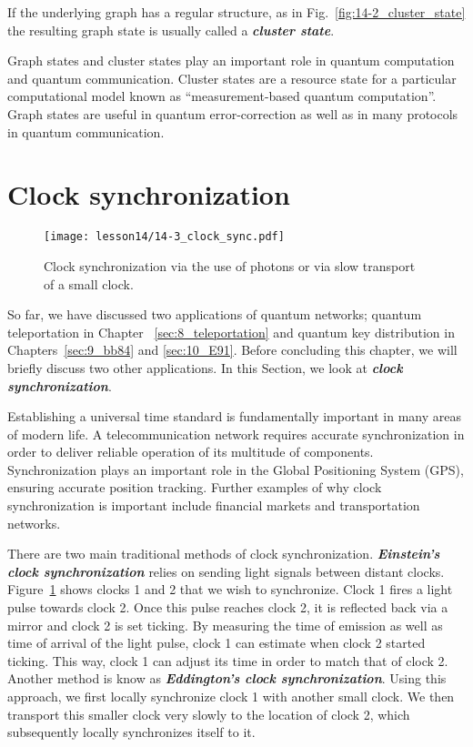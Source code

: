 If the underlying graph has a regular structure, as in Fig.~\ref{fig:14-2_cluster_state} the resulting graph state is usually called a \textbf{\emph{cluster state}}.

Graph states and cluster states play an important role in quantum computation and quantum communication.
Cluster states are a resource state for a particular computational model known as ``measurement-based quantum computation''.
Graph states are useful in quantum error-correction as well as in many protocols in quantum communication.




\section{Clock synchronization}
\label{sec:14-3_clock_sync}

\begin{figure}[t]
    \centering
    \texttt{[image: lesson14/14-3\_clock\_sync.pdf]}
    \caption[Clock synchronization.]{Clock synchronization via the use of photons or via slow transport of a small clock.}
    \label{fig:14-3_clock_sync}
\end{figure}

So far, we have discussed two applications of quantum networks; quantum teleportation in Chapter ~\ref{sec:8_teleportation} and quantum key distribution in Chapters~\ref{sec:9_bb84} and \ref{sec:10_E91}.
Before concluding this chapter, we will briefly discuss two other applications.
In this Section, we look at \textbf{\emph{clock synchronization}}.

Establishing a universal time standard is fundamentally important in many areas of modern life.
A telecommunication network requires accurate synchronization in order to deliver reliable operation of its multitude of components.
Synchronization plays an important role in the Global Positioning System (GPS), ensuring accurate position tracking.
Further examples of why clock synchronization is important include financial markets and transportation networks.

There are two main traditional methods of clock synchronization.
\textbf{\emph{Einstein's clock synchronization}} relies on sending light signals between distant clocks.
Figure~\ref{fig:14-3_clock_sync} shows clocks 1 and 2 that we wish to synchronize.
Clock 1 fires a light pulse towards clock 2.
Once this pulse reaches clock 2, it is reflected back via a mirror and clock 2 is set ticking.
By measuring the time of emission as well as time of arrival of the light pulse, clock 1 can estimate when clock 2 started ticking.
This way, clock 1 can adjust its time in order to match that of clock 2.
Another method is know as \textbf{\emph{Eddington's clock synchronization}}.
Using this approach, we first locally synchronize clock 1 with another small clock.
We then transport this smaller clock very slowly to the location of clock 2, which subsequently locally synchronizes itself to it.

